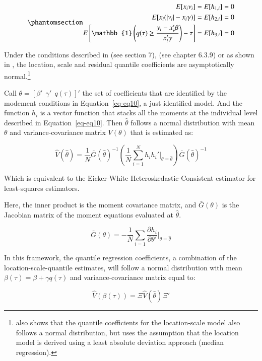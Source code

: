 \documentclass[
  authoryear,
  review,
  1p]{elsarticle}
\begin{document}
\begin{equation}\phantomsection\label{eq-eq10}{\begin{aligned}
  E[x_i \nu_i  ] &= E[h_{1,i}]=0 \\
  E[x_i  (|\nu_i|-x_i \gamma) ] &=E[h_{2,i}]=0 \\
  E\left[  \mathbb{1}\left(   q(\tau)\geq \frac{y_i-x_i'\beta}{x_i'\gamma} \right) - \tau \right] 
  &=E[h_{3,i}]=0 
  \end{aligned}
}\end{equation}

Under the conditions described in \citet{newey_chapter_1994} (see
section 7), \citet{cameron2005} (see chapter 6.3.9) or as shown in
\citet{mss2019}, the location, scale and residual quantile coefficients
are asymptotically normal.\footnote{\citet{zhao2000} also shows that the
  quantile coefficients for the location-scale model also follows a
  normal distribution, but uses the assumption that the location model
  is derived using a least absolute deviation approach (median
  regression).}

Call \(\theta=[ \beta' \ \ \gamma' \ \ q(\tau) ]'\) the set of
coefficients that are identified by the modement conditions in
Equation~\ref{eq-eq10}, a just identified model. And the function
\(h_i\) is a vector function that stacks all the moments at the
individual level described in Equation~\ref{eq-eq10}. Then
\(\hat\theta\) follows a normal distribution with mean \(\theta\) and
variance-covariance matrix \(V(\theta)\) that is estimated as:

\[
\hat{V}(\hat\theta)=\frac{1}{N} 
\bar G(\hat\theta)^{-1} 
\left( \frac{1}{N} \sum_{i=1}^N h_i h_i'  \Big|_{\theta=\hat\theta} \right) 
\bar G(\hat\theta)^{-1} 
\]

Which is equivalent to the Eicker-White Heteroskedastic-Consistent
estimator for least-squares estimators.

Here, the inner product is the moment covariance matrix, and
\(\bar{G}(\theta)\) is the Jacobian matrix of the moment equations
evaluated at \(\hat\theta\).

\[\bar{G}(\theta) =-\frac{1}{N} \sum_{i=1} \frac{\partial h_i}{\partial \theta'} \Big|_{\theta=\hat\theta}\]

In this framework, the quantile regression coefficients, a combination
of the location-scale-quantile estimates, will follow a normal
distribution with mean \(\beta(\tau) = \beta+\gamma q(\tau)\) and
variance-covariance matrix equal to:

\[\hat{V}(\beta(\tau)) = \Xi \hat{V}(\hat\theta) \Xi'
\]
\end{document}
